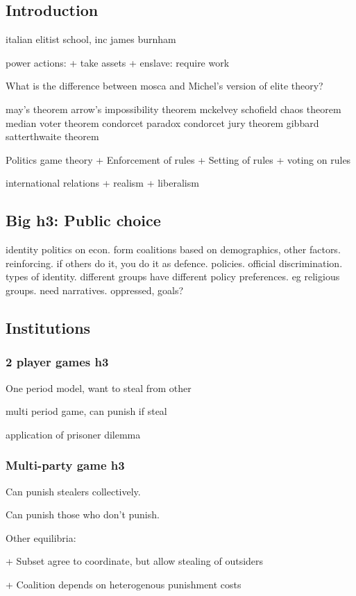 
\subsection{Introduction}

italian elitist school, inc james burnham

power actions:
+ take assets
+ enslave: require work

What is the difference between mosca and Michel's version of elite theory?

may's theorem
arrow's impossibility theorem
mckelvey schofield chaos theorem
median voter theorem
condorcet paradox
condorcet jury  theorem
gibbard satterthwaite theorem


Politics game theory
+ Enforcement of rules
+ Setting of rules
+ voting on rules


international relations
+ realism
+ liberalism

\subsection{Big h3: Public choice}
identity politics on econ. form coalitions based on demographics, other factors. reinforcing. if others do it, you do it as defence.
policies. official discrimination. types of identity. different groups have different policy preferences. eg religious groups. need narratives. oppressed, goals?

\subsection{Institutions}
\subsubsection{2 player games h3}
One period model, want to steal from other

multi period game, can punish if steal

application of prisoner dilemma
\subsubsection{Multi-party game h3}
Can punish stealers collectively.

Can punish those who don't punish.

Other equilibria:

+ Subset agree to coordinate, but allow stealing of outsiders

+ Coalition depends on heterogenous punishment costs

